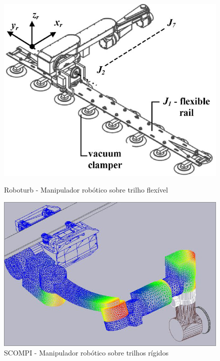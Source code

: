 \begin{figure}[!htb]
	\centering
    \begin{minipage}[b]{0.45\linewidth}	
		\includegraphics[width=\columnwidth]{figs/trilhos/roboturbpaper}
		\caption{Roboturb - Manipulador robótico sobre trilho flexível}
		\label{fig::roboturb}
	\end{minipage}
	\begin{minipage}[b]{0.45\linewidth}
		\includegraphics[width=\columnwidth]{figs/trilhos/scompi}
		\caption{SCOMPI - Manipulador robótico sobre trilhos rígidos}
		\label{fig::scompi}
	\end{minipage}
\end{figure}

